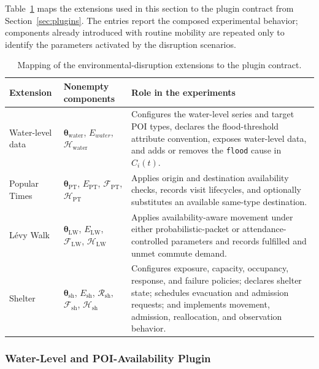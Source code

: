 Table~\ref{tbl:environment_disruption_plugin_contract} maps the extensions used in this section to the plugin contract from Section~\ref{sec:plugins}. The entries report the composed experimental behavior; components already introduced with routine mobility are repeated only to identify the parameters activated by the disruption scenarios.

\begin{table}[ht]
\centering
\footnotesize
\setlength{\tabcolsep}{4pt}
\caption{Mapping of the environmental-disruption extensions to the plugin contract.}
\label{tbl:environment_disruption_plugin_contract}
\begin{tabularx}{\linewidth}{@{}p{2.7cm}p{3.7cm}X@{}}
\toprule
\textbf{Extension} & \textbf{Nonempty components} & \textbf{Role in the experiments} \\
\midrule
Water-level data
& $\bm{\theta}_{\mathrm{water}}$, $E_{water}$, $\mathcal{H}_{\mathrm{water}}$
& Configures the water-level series and target POI types, declares the flood-threshold attribute convention, exposes water-level data, and adds or removes the \texttt{flood} cause in $C_i(t)$. \\
Popular Times
& $\bm{\theta}_{\mathrm{PT}}$, $E_{\mathrm{PT}}$, $\mathcal{F}_{\mathrm{PT}}$, $\mathcal{H}_{\mathrm{PT}}$
& Applies origin and destination availability checks, records visit lifecycles, and optionally substitutes an available same-type destination. \\
L\'evy Walk
& $\bm{\theta}_{\mathrm{LW}}$, $E_{\mathrm{LW}}$, $\mathcal{F}_{\mathrm{LW}}$, $\mathcal{H}_{\mathrm{LW}}$
& Applies availability-aware movement under either probabilistic-packet or attendance-controlled parameters and records fulfilled and unmet commute demand. \\
Shelter
& $\bm{\theta}_{\mathrm{sh}}$, $E_{\mathrm{sh}}$, $\mathcal{R}_{\mathrm{sh}}$, $\mathcal{F}_{\mathrm{sh}}$, $\mathcal{H}_{\mathrm{sh}}$
& Configures exposure, capacity, occupancy, response, and failure policies; declares shelter state; schedules evacuation and admission requests; and implements movement, admission, reallocation, and observation behavior. \\
\bottomrule
\end{tabularx}
\end{table}
\FloatBarrier

\subsubsection{Water-Level and POI-Availability Plugin}

